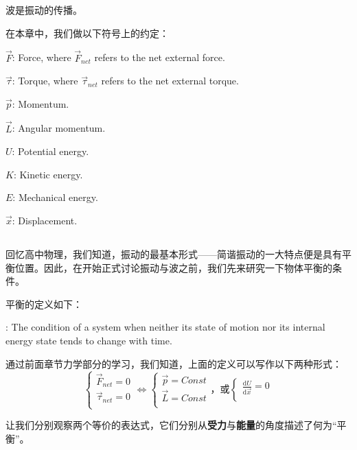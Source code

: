 \newcommand{\D}[3][]{\dfrac{\dif^{#1} #2}{\dif#3^{#1}}}
\newcommand{\Par}[3][]{\dfrac{\partial^{#1} #2}{\partial#3^{#1}}}
\chapter[振动与波]{}
波是振动的传播。

在本章中，我们做以下符号上的约定：
\begin{Itemize}
    \item $\vec{F}$: Force, where $\vec{F}_{net}$ refers to the net external force.
    \item $\vec{\tau}$: Torque, where $\vec{\tau}_{net}$ refers to the net external torque.
    \item $\vec{p}$: Momentum.
    \item $\vec{L}$: Angular momentum.
    \item $U$: Potential energy.
    \item $K$: Kinetic energy.
    \item $E$: Mechanical energy.
    \item $\vec{x}$: Displacement.
\end{Itemize}
\section[平衡]{}
回忆高中物理，我们知道，振动的最基本形式——简谐振动的一大特点便是具有平衡位置。因此，在开始正式讨论振动与波之前，我们先来研究一下物体平衡的条件。

平衡的定义如下：
\begin{Itemize}
    \item {}: The condition of a system when neither its state of motion nor its internal energy state tends to change with time.
\end{Itemize}
通过前面章节力学部分的学习，我们知道，上面的定义可以写作以下两种形式：
$$
    \left\{\begin{aligned}
        \vec{F}_{net}=0    \\
        \vec{\tau}_{net}=0 \\
    \end{aligned}
    \right.
    \Leftrightarrow
    \left\{\begin{aligned}
        \vec{p}=Const \\
        \vec{L}=Const \\
    \end{aligned}
    \right.
    \text{，或}
    \left\{\begin{aligned}
        \frac{\mathrm{d}U}{\mathrm{d}\vec{x}}=0 \\
    \end{aligned}
    \right.
$$\par
让我们分别观察两个等价的表达式，它们分别从\textbf{受力}与\textbf{能量}的角度描述了何为“平衡”。

